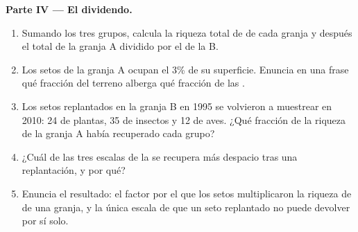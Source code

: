 \begin{problem}
\medskip
\noindent\textbf{Parte IV --- El dividendo.}
\begin{enumerate}[resume]
  \item Sumando los tres grupos, calcula la riqueza total de 
        de cada granja y después el total de la granja A dividido por
        el de la B.
  \item Los setos de la granja A ocupan el 3\% de su superficie.
        Enuncia en una frase qué fracción del terreno alberga qué
        fracción de las .
  \item Los setos replantados en la granja B en 1995 se volvieron a
        muestrear en 2010: 24  de plantas, 35 de insectos y 12
        de aves. ¿Qué fracción de la riqueza de la granja A había
        recuperado cada grupo?
  \item ¿Cuál de las tres escalas de la  se recupera más
        despacio tras una replantación, y por qué?
  \item Enuncia el resultado: el factor por el que los setos
        multiplicaron la riqueza de  de una granja, y la única
        escala de  que un seto replantado no puede
        devolver por sí solo.
\end{enumerate}
\end{problem}
